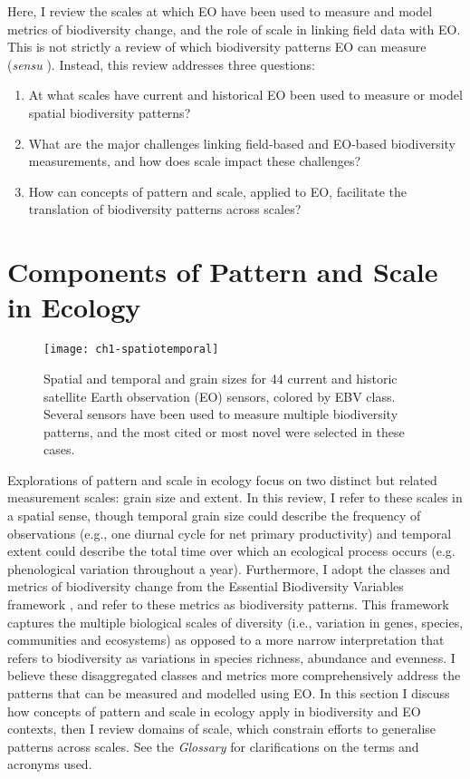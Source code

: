 Here, I review the scales at which EO have been used to measure and model metrics of biodiversity change, and the role of scale in linking field data with EO. This is not strictly a review of which biodiversity patterns EO can measure (\textit{sensu} \cite{Roughgarden1991-so,Turner2003-dp,Wang2010-ev,Pettorelli2014-yz, Lausch2016-fk}). Instead, this review addresses three questions: 

\begin{enumerate}
    \item At what scales have current and historical EO been used to measure or model spatial biodiversity patterns? 
    \item What are the major challenges linking field‐based and EO‐based biodiversity measurements, and how does scale impact these challenges?
    \item How can concepts of pattern and scale, applied to EO, facilitate the translation of biodiversity patterns across scales? 
\end{enumerate}

\section{Components of Pattern and Scale in Ecology}

\begin{figure}[!ht]
\texttt{[image: ch1-spatiotemporal]}
\centering
\caption[Spatial and temporal and grain sizes for 44 current and historic satellite Earth observation (EO) sensors.]{Spatial and temporal and grain sizes for 44 current and historic satellite Earth observation (EO) sensors, colored by EBV class. Several sensors have been used to measure multiple biodiversity patterns, and the most cited or most novel were selected in these cases.}
\label{fig:spatiotemporal}
\end{figure}

Explorations of pattern and scale in ecology focus on two distinct but related measurement scales: grain size and extent. In this review, I refer to these scales in a spatial sense, though temporal grain size could describe the frequency of observations (e.g., one diurnal cycle for net primary productivity) and temporal extent could describe the total time over which an ecological process occurs (e.g. phenological variation throughout a year). Furthermore, I adopt the classes and metrics of biodiversity change from the Essential Biodiversity Variables framework \cite{Pereira2013-pk}, and refer to these metrics as biodiversity patterns. This framework captures the multiple biological scales of diversity (i.e., variation in genes, species, communities and ecosystems) as opposed to a more narrow interpretation that refers to biodiversity as variations in species richness, abundance and evenness. I believe these disaggregated classes and metrics more comprehensively address the patterns that can be measured and modelled using EO. In this section I discuss how concepts of pattern and scale in ecology apply in biodiversity and EO contexts, then I review domains of scale, which constrain efforts to generalise patterns across scales. See the \textit{Glossary} for clarifications on the terms and acronyms used.

